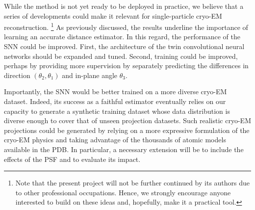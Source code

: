 While the method is not yet ready to be deployed in practice, we believe that a series of developments could make it relevant for single-particle cryo-EM reconstruction.%
\footnote{Note that the present project will not be further continued by its authors due to other professional occupations. Hence, we strongly encourage anyone interested to build on these ideas and, hopefully, make it a practical tool.}
As previously discussed, the results underline the importance of learning an accurate distance estimator. %
In this regard, the performance of the SNN could be improved.
First, the architecture of the twin convolutional neural networks should be expanded and tuned.
Second, training could be improved, perhaps by providing more supervision by separately predicting the differences in direction $(\theta_2,\theta_1)$ and in-plane angle $\theta_3$.


Importantly, the SNN would be better trained on a more diverse cryo-EM dataset.
Indeed, its success as a faithful estimator eventually relies on our capacity to generate a synthetic training dataset whose data distribution is diverse enough to cover that of unseen projection datasets.
Such realistic cryo-EM projections could be generated by relying on a more expressive formulation of the cryo-EM physics and taking advantage of the thousands of atomic models available in the PDB\@.
In particular, a necessary extension will be to include the effects of the PSF and to evaluate its impact.

